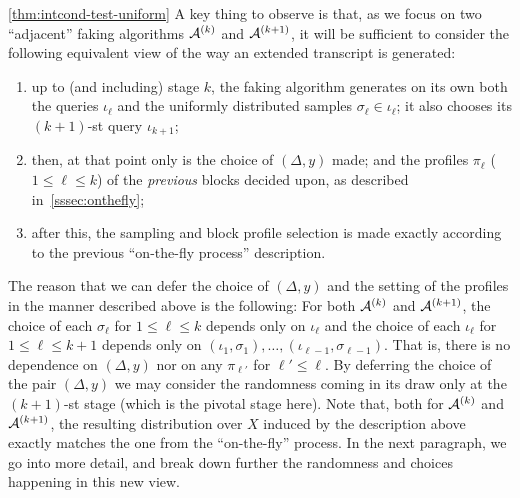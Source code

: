 \begin{proofof}{\cref{thm:intcond-test-uniform}}
A key thing to observe is that, as we focus on two ``adjacent'' faking algorithms $\mathcal{A}^{(k)}$ and $\mathcal{A}^{(k+1)}$, it will be sufficient to consider the following equivalent view of the way an extended transcript is generated:
\begin{enumerate}
  \item\label{item:gen:ext:transcript:1} up to (and including) stage $k$, the faking algorithm generates on its own both the queries $\iota_\ell$ and the uniformly distributed samples $\sigma_\ell\in\iota_\ell$; it also chooses its $(k+1)$-st query $\iota_{k+1}$;
  \item\label{item:gen:ext:transcript:2} then, at that point only is the choice of $(\Delta,y)$ made; and the profiles $\pi_\ell$ ($1\leq \ell\leq k$) of the \emph{previous} blocks decided upon, as described in~\cref{sssec:onthefly};
  \item\label{item:gen:ext:transcript:3} after this, the sampling and block profile selection is made exactly according to the previous ``on-the-fly process'' description.
\end{enumerate}
      The reason that we can defer the choice of $(\Delta,y)$ and the setting of
      the profiles in the manner described above is the following: For both $\mathcal{A}^{(k)}$ and $\mathcal{A}^{(k+1)}$, the choice of each $\sigma_\ell$
       for $1 \leq \ell \leq k$ depends only on $\iota_\ell$ and the choice of each
       $\iota_\ell$ for
      $1 \leq \ell \leq k+1$ depends only on $(\iota_1,\sigma_1),\dots,(\iota_{\ell-1},\sigma_{\ell-1})$.
      That is, there is no dependence on $(\Delta,y)$ nor on any $\pi_{\ell'}$ for $\ell' \leq \ell$.
By deferring the choice of the pair $(\Delta,y)$ we may consider the randomness coming in its draw only at the $(k+1)$-st stage (which is the pivotal stage here).
Note that, both for $\mathcal{A}^{(k)}$ and $\mathcal{A}^{(k+1)}$, the resulting distribution over $X$ induced by the description above exactly matches the one from the ``on-the-fly'' process. In the next paragraph, we go into more detail, and break down further the randomness and choices happening in this new view.


\end{proofof}
